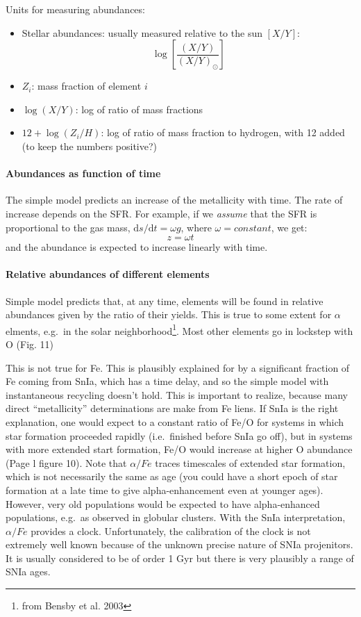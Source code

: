 \documentclass{article}
\begin{document}
Units for measuring abundances:
\begin{itemize}
    \item Stellar abundances: usually measured relative to the sun
        $[X/Y]$:
        \[ \log\left[\frac{(X/Y)}{(X/Y)_{\odot}}\right] \]
    \item $Z_{i}$: mass fraction of element $i$
    \item $\log(X/Y)$: log of ratio of mass fractions
    \item $12 + \log(Z_{i}/H)$: log of ratio of mass fraction to hydrogen,
        with 12 added (to keep the numbers positive?)
\end{itemize}


\paragraph{Abundances as function of time}
The simple model predicts an increase of the metallicity with time.
The rate of increase depends on the SFR.
For example, if we \emph{assume} that the SFR is proportional to the
gas mass, $\mathrm{d}s/\mathrm{d}t = \omega{g}$, where $\omega = constant$,
we get:
\[
    z = \omega{t}
\]
and the abundance is expected to increase linearly with time.

\paragraph{Relative abundances of different elements}
Simple model predicts that, at any time, elements will be found in relative
abundances given by the ratio of their yields. This is true to some extent
for $\alpha$ elments, e.g.\ in the solar neighborhood\footnote{from
Bensby et al. 2003}. Most other elements go in lockstep with O (Fig. 11)

This is not true for Fe. This is plausibly explained for by a significant
fraction of Fe coming from SnIa, which has a time delay, and so the simple
model with instantaneous recycling doesn't hold. This is important to realize,
because many direct ``metallicity'' determinations are make from Fe liens.
If SnIa is the right explanation, one would expect to a constant ratio
of Fe/O for systems in which star formation proceeded rapidly (i.e.\ finished
before SnIa go off), but in systems with more extended start formation,
Fe/O would increase at higher O abundance (Page l figure 10).
Note that $\alpha/Fe$ traces timescales of extended star formation,
which is not necessarily the same as age (you could have a short epoch
of star formation at a late time to give alpha-enhancement even at younger
ages). However, very old populations would be expected to have alpha-enhanced
populations, e.g.\ as observed in globular clusters.
With the SnIa interpretation, $\alpha/Fe$ provides a clock. Unfortunately,
the calibration of the clock is not extremely well known because of the
unknown precise nature of SNIa projenitors. It is usually considered
to be of order 1 Gyr but there is very plausibly a range of SNIa ages.
\end{document}
